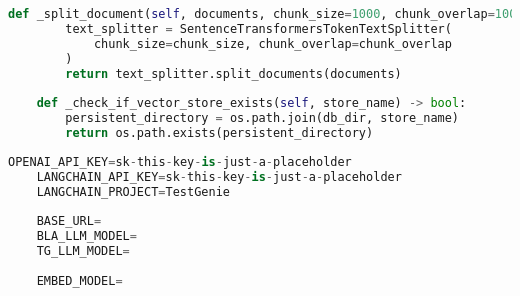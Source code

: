 \begin{lstlisting}[language=Python, caption={$\texttt{AI\_Agent}$ class.}, label={lst:12}]
    def _split_document(self, documents, chunk_size=1000, chunk_overlap=100):
        text_splitter = SentenceTransformersTokenTextSplitter(
            chunk_size=chunk_size, chunk_overlap=chunk_overlap
        )
        return text_splitter.split_documents(documents)
    
    def _check_if_vector_store_exists(self, store_name) -> bool:
        persistent_directory = os.path.join(db_dir, store_name)
        return os.path.exists(persistent_directory)

\end{lstlisting}

\begin{lstlisting}[language=Python, caption={$\texttt{Sample .env}$ file.}, label={lst:13}]
    OPENAI_API_KEY=sk-this-key-is-just-a-placeholder
    LANGCHAIN_API_KEY=sk-this-key-is-just-a-placeholder
    LANGCHAIN_PROJECT=TestGenie
    
    BASE_URL=
    BLA_LLM_MODEL=
    TG_LLM_MODEL=
    
    EMBED_MODEL=
\end{lstlisting}

